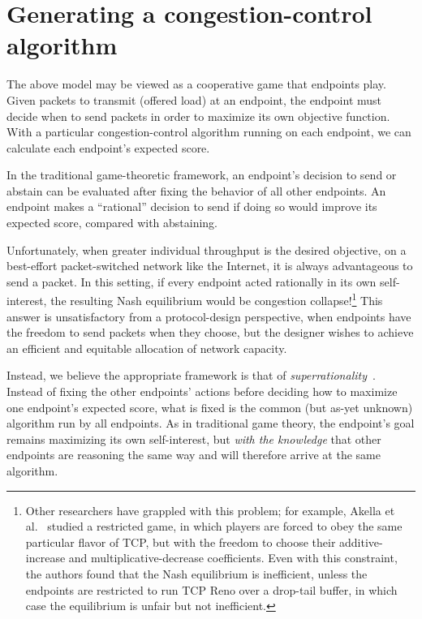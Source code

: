 \section{Generating a congestion-control algorithm}
\label{s:design}

The above model may be viewed as a cooperative game that endpoints play. Given
packets to transmit (offered load) at an endpoint, the endpoint must
decide when to send packets in order to maximize its own objective
function. With a particular congestion-control algorithm running on
each endpoint, we can calculate each endpoint's expected score.

In the traditional game-theoretic framework, an endpoint's decision to
send or abstain can be evaluated after fixing the behavior of all
other endpoints. An endpoint makes a ``rational'' decision to send if
doing so would improve its expected score, compared with abstaining.

Unfortunately, when greater individual throughput is the desired
objective, on a best-effort packet-switched network like the Internet,
it is always advantageous to send a packet. In this setting, if every
endpoint acted rationally in its own self-interest, the resulting Nash
equilibrium would be congestion collapse!\footnote{Other researchers
  have grappled with this problem; for example, Akella et
  al.~\cite{Akella02} studied a restricted game, in which players are
  forced to obey the same particular flavor of TCP, but with the freedom
  to choose their additive-increase and multiplicative-decrease
  coefficients. Even with this constraint, the authors found that the Nash
  equilibrium is inefficient, unless the endpoints are restricted to
  run TCP Reno over a drop-tail buffer, in which case the equilibrium
  is unfair but not inefficient.}  This answer is unsatisfactory from
a protocol-design perspective, when endpoints have the freedom to send
packets when they choose, but the designer wishes to achieve an
efficient and equitable allocation of network capacity.

Instead, we believe the appropriate framework is that of {\em
  superrationality}~\cite{hofstadter1985metamagical}. Instead of
fixing the other endpoints' actions before deciding how to maximize
one endpoint's expected score, what is fixed is the common (but as-yet
unknown) algorithm run by all endpoints. As in traditional game
theory, the endpoint's goal remains maximizing its own self-interest,
but {\em with the knowledge} that other endpoints are reasoning the
same way and will therefore arrive at the same algorithm.

